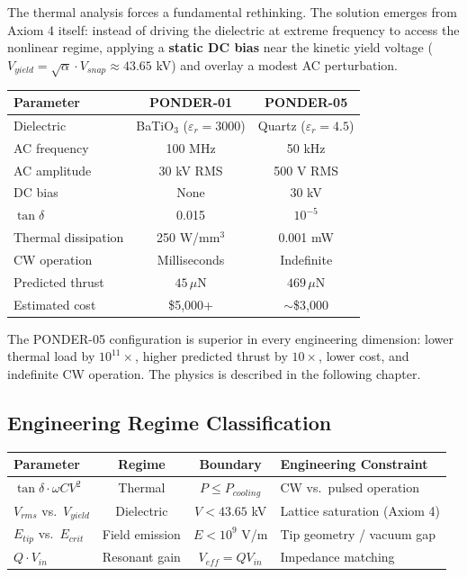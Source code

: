 The thermal analysis forces a fundamental rethinking. The solution emerges from Axiom 4 itself: instead of driving the dielectric at extreme frequency to access the nonlinear regime, applying a \textbf{static DC bias} near the kinetic yield voltage ($V_{yield} = \sqrt{\alpha} \cdot V_{snap} \approx 43.65$ kV) and overlay a modest AC perturbation.

\begin{center}
\begin{tabular}{|l|c|c|}
\hline
Parameter & PONDER-01 & PONDER-05 \\ \hline
Dielectric & BaTiO$_3$ ($\varepsilon_r = 3000$) & Quartz ($\varepsilon_r = 4.5$) \\
AC frequency & 100 MHz & 50 kHz \\
AC amplitude & 30 kV RMS & 500 V RMS \\
DC bias & None & 30 kV \\
$\tan\delta$ & 0.015 & $10^{-5}$ \\
Thermal dissipation & 250 W/mm$^3$ & 0.001 mW \\
CW operation & Milliseconds & Indefinite \\
Predicted thrust & $45\,\mu$N & $469\,\mu$N \\
Estimated cost & \$5{,}000+ & $\sim$\$3{,}000 \\
\hline
\end{tabular}
\end{center}

The PONDER-05 configuration is superior in every engineering dimension: lower thermal load by $10^{11}\times$, higher predicted thrust by $10\times$, lower cost, and indefinite CW operation. The physics is described in the following chapter.

\subsection*{Engineering Regime Classification}
\begin{center}
\small
\renewcommand{\arraystretch}{1.2}
\begin{tabular}{lccl}
\toprule
\textbf{Parameter} & \textbf{Regime} & \textbf{Boundary} & \textbf{Engineering Constraint} \\
\midrule
$\tan\delta \cdot \omega C V^2$ & Thermal & $P \leq P_{cooling}$ & CW vs.\ pulsed operation \\
$V_{rms}$ vs.\ $V_{yield}$ & Dielectric & $V < 43.65$ kV & Lattice saturation (Axiom 4) \\
$E_{tip}$ vs.\ $E_{crit}$ & Field emission & $E < 10^9$ V/m & Tip geometry / vacuum gap \\
$Q \cdot V_{in}$ & Resonant gain & $V_{eff} = Q V_{in}$ & Impedance matching \\
\bottomrule
\end{tabular}
\end{center}
